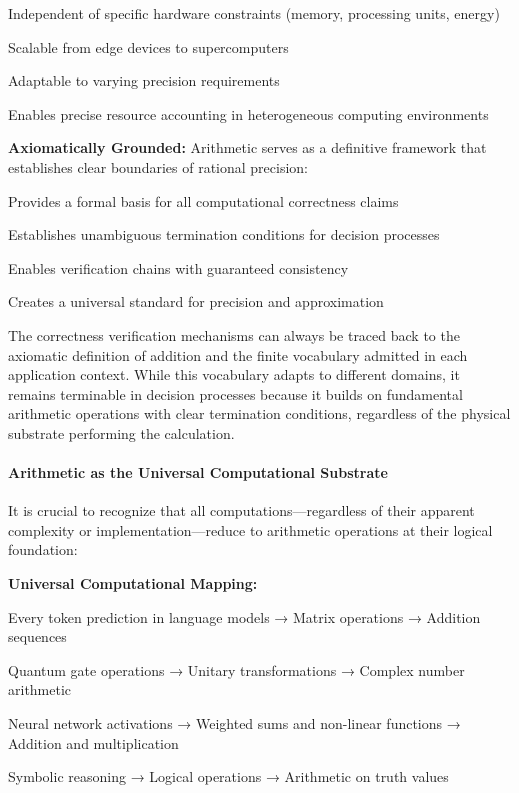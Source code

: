 \noindent Independent of specific hardware constraints (memory, processing units, energy)


\noindent Scalable from edge devices to supercomputers


\noindent Adaptable to varying precision requirements


\noindent Enables precise resource accounting in heterogeneous computing environments



\noindent\textbf{\textbf{Axiomatically Grounded:} } Arithmetic serves as a definitive framework that establishes clear boundaries of rational precision:


\noindent Provides a formal basis for all computational correctness claims


\noindent Establishes unambiguous termination conditions for decision processes


\noindent Enables verification chains with guaranteed consistency


\noindent Creates a universal standard for precision and approximation


The correctness verification mechanisms can always be traced back to the axiomatic definition of addition and the finite vocabulary admitted in each application context. While this vocabulary adapts to different domains, it remains terminable in decision processes because it builds on fundamental arithmetic operations with clear termination conditions, regardless of the physical substrate performing the calculation.
\paragraph{Arithmetic as the Universal Computational Substrate}

It is crucial to recognize that all computations—regardless of their apparent complexity or implementation—reduce to arithmetic operations at their logical foundation:


\noindent\textbf{\textbf{Universal Computational Mapping:} }


\noindent Every token prediction in language models → Matrix operations → Addition sequences


\noindent Quantum gate operations → Unitary transformations → Complex number arithmetic


\noindent Neural network activations → Weighted sums and non-linear functions → Addition and multiplication


\noindent Symbolic reasoning → Logical operations → Arithmetic on truth values




